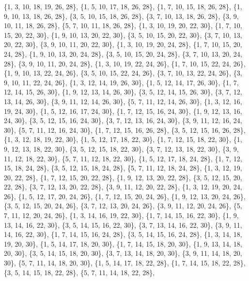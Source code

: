 \documentclass[11pt,a4paper]{article}
\begin{document}
{\{1, 3, 10, 18, 19, 26, 28\}, \{1, 5, 10, 17, 18, 26, 28\}, \{1, 7, 10, 15, 18, 26, 28\}, \{1, 9, 10, 13, 18, 26, 28\}, \{3, 5, 10, 15, 18, 26, 28\},
\{3, 7, 10, 13, 18, 26, 28\}, \{3, 9, 10, 11, 18, 26, 28\}, \{5, 7, 10, 11, 18, 26, 28\}, \{1, 3, 10, 19, 20, 22, 30\}, \{1, 7, 10, 15, 20, 22, 30\},
\{1, 9, 10, 13, 20, 22, 30\}, \{3, 5, 10, 15, 20, 22, 30\}, \{3, 7, 10, 13, 20, 22, 30\}, \{3, 9, 10, 11, 20, 22, 30\}, \{1, 3, 10, 19, 20, 24, 28\},
\{1, 7, 10, 15, 20, 24, 28\}, \{1, 9, 10, 13, 20, 24, 28\}, \{3, 5, 10, 15, 20, 24, 28\}, \{3, 7, 10, 13, 20, 24, 28\}, \{3, 9, 10, 11, 20, 24, 28\},
\{1, 3, 10, 19, 22, 24, 26\}, \{1, 7, 10, 15, 22, 24, 26\}, \{1, 9, 10, 13, 22, 24, 26\}, \{3, 5, 10, 15, 22, 24, 26\}, \{3, 7, 10, 13, 22, 24, 26\},
\{3, 9, 10, 11, 22, 24, 26\}, \{1, 3, 12, 14, 19, 26, 30\}, \{1, 5, 12, 14, 17, 26, 30\}, \{1, 7, 12, 14, 15, 26, 30\}, \{1, 9, 12, 13, 14, 26, 30\},
\{3, 5, 12, 14, 15, 26, 30\}, \{3, 7, 12, 13, 14, 26, 30\}, \{3, 9, 11, 12, 14, 26, 30\}, \{5, 7, 11, 12, 14, 26, 30\}, \{1, 3, 12, 16, 19, 24, 30\},
\{1, 5, 12, 16, 17, 24, 30\}, \{1, 7, 12, 15, 16, 24, 30\}, \{1, 9, 12, 13, 16, 24, 30\}, \{3, 5, 12, 15, 16, 24, 30\}, \{3, 7, 12, 13, 16, 24, 30\},
\{3, 9, 11, 12, 16, 24, 30\}, \{5, 7, 11, 12, 16, 24, 30\}, \{1, 7, 12, 15, 16, 26, 28\}, \{3, 5, 12, 15, 16, 26, 28\}, \{1, 3, 12, 18, 19, 22, 30\},
\{1, 5, 12, 17, 18, 22, 30\}, \{1, 7, 12, 15, 18, 22, 30\}, \{1, 9, 12, 13, 18, 22, 30\}, \{3, 5, 12, 15, 18, 22, 30\}, \{3, 7, 12, 13, 18, 22, 30\},
\{3, 9, 11, 12, 18, 22, 30\}, \{5, 7, 11, 12, 18, 22, 30\}, \{1, 5, 12, 17, 18, 24, 28\}, \{1, 7, 12, 15, 18, 24, 28\}, \{3, 5, 12, 15, 18, 24, 28\},
\{5, 7, 11, 12, 18, 24, 28\}, \{1, 3, 12, 19, 20, 22, 28\}, \{1, 7, 12, 15, 20, 22, 28\}, \{1, 9, 12, 13, 20, 22, 28\}, \{3, 5, 12, 15, 20, 22, 28\},
\{3, 7, 12, 13, 20, 22, 28\}, \{3, 9, 11, 12, 20, 22, 28\}, \{1, 3, 12, 19, 20, 24, 26\}, \{1, 5, 12, 17, 20, 24, 26\}, \{1, 7, 12, 15, 20, 24, 26\},
\{1, 9, 12, 13, 20, 24, 26\}, \{3, 5, 12, 15, 20, 24, 26\}, \{3, 7, 12, 13, 20, 24, 26\}, \{3, 9, 11, 12, 20, 24, 26\}, \{5, 7, 11, 12, 20, 24, 26\},
\{1, 3, 14, 16, 19, 22, 30\}, \{1, 7, 14, 15, 16, 22, 30\}, \{1, 9, 13, 14, 16, 22, 30\}, \{3, 5, 14, 15, 16, 22, 30\}, \{3, 7, 13, 14, 16, 22, 30\},
\{3, 9, 11, 14, 16, 22, 30\}, \{1, 7, 14, 15, 16, 24, 28\}, \{3, 5, 14, 15, 16, 24, 28\}, \{1, 3, 14, 18, 19, 20, 30\}, \{1, 5, 14, 17, 18, 20, 30\},
\{1, 7, 14, 15, 18, 20, 30\}, \{1, 9, 13, 14, 18, 20, 30\}, \{3, 5, 14, 15, 18, 20, 30\}, \{3, 7, 13, 14, 18, 20, 30\}, \{3, 9, 11, 14, 18, 20, 30\},
\{5, 7, 11, 14, 18, 20, 30\}, \{1, 5, 14, 17, 18, 22, 28\}, \{1, 7, 14, 15, 18, 22, 28\}, \{3, 5, 14, 15, 18, 22, 28\}, \{5, 7, 11, 14, 18, 22, 28\},
}
\end{document}
